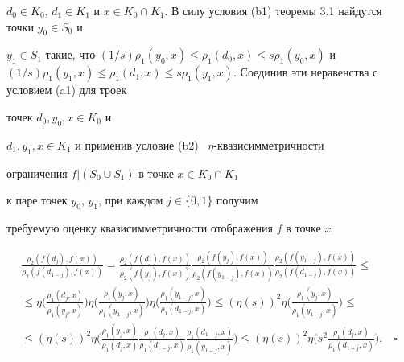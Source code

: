 $d_0 \in K_0$, $d_1 \in K_1$ и $x\in K_0\cap 


K_1$. В силу условия (b1) теоремы 3.1 найдутся точки $y_0 \in S_0$ и 


$y_1 \in S_1$ такие, что $(1/s)\rho_1(y_0, x) \leq \rho_1(d_0, x) \leq 


s \rho_1(y_0, x)$ и $(1/s)\rho_1(y_1, x) \leq \rho_1(d_1, x) \leq 


s \rho_1(y_1, x)$. Соединив эти неравенства с условием (a1) для троек 


точек $d_0, y_0, x \in K_0$ и 


$d_1, y_1, x \in K_1$ и применив условие (b2) \ $\eta$-{}ква\-зисимметричности 


ограничения $f|(S_0\cup S_1)$ в точке $x\in K_0\cap K_1$ 


к паре точек $y_0$, $y_1$, при каждом $j \in \{ 0, 1\} $ получим


требуемую оценку квазисимметричности отображения $f$ в точке $x$


\begin{gather*}


\frac{\rho_2(f(d_j), f(x))}{\rho_2(f(d_{1-j}), f(x))}=


\frac{\rho_2(f(d_j), f(x))}{\rho_2(f(y_j), f(x))}


\frac{\rho_2(f(y_j), f(x))}{\rho_2(f(y_{1-j}), f(x))}


\frac{\rho_2(f(y_{1-j}), f(x))}{\rho_2(f(d_{1-j}), f(x))} \leq \\


%


\leq \eta\bigg( \frac{\rho_1(d_j, x)}{\rho_1(y_j, x)} \bigg)


\eta\bigg( \frac{\rho_1(y_j, x)}{\rho_1(y_{1-j}, x)} \bigg)


\eta\bigg( \frac{\rho_1(y_{1-j}, x)}{\rho_1(d_{1-j}, x)} \bigg) \leq


(\eta(s))^2 \eta\bigg( \frac{\rho_1(y_j, x)}{\rho_1(y_{1-j}, x)} \bigg) \leq\\ 


%


\leq (\eta(s))^2 \eta \bigg( \frac{\rho_1(y_j, x)}{\rho_1(d_j, x)}


\frac{\rho_1(d_j, x)}{\rho_1(d_{1-j}, x)}\frac{\rho_1(d_{1-j}, x)}


{\rho_1(y_{1-j}, x)} \bigg) \leq (\eta(s))^2 \eta\bigg( s^2 


\frac{\rho_1(d_j, x)}{\rho_1(d_{1-j}, x)} \bigg).\quad\square


\end{gather*}









